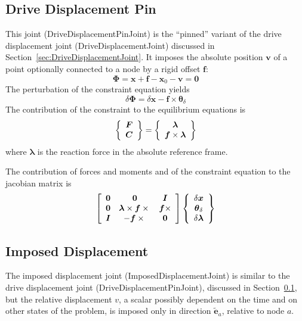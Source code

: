 \documentclass[10pt,dvips,fleqn]{report}
\newcommand{\T}[1]{\boldsymbol{#1}}
\begin{document}
\subsection{Drive Displacement Pin}
\label{sec:DriveDisplacementPinJoint}
This joint (DriveDisplacementPinJoint) is the ``pinned'' variant 
of the drive displacement joint (DriveDisplacementJoint) discussed
in Section~\ref{sec:DriveDisplacementJoint}.
It imposes the absolute position $\T{v}$ of a point
optionally connected to a node by a rigid offset $\T{f}$:
\begin{equation}
	\T{\Phi} = \T{x} + \T{f} - \T{x}_0 - \T{v} = \T{0}
\end{equation}
The perturbation of the constraint equation yields
\begin{equation}
	\delta\T{\Phi} = 
	\delta\T{x} - \T{f}\times \T{\theta}_{\delta}
\end{equation}
The contribution of the constraint to the equilibrium equations is
\begin{equation}
	\cubr{\cvvect{
		\T{F} \\
		\T{C}
	}} = \cubr{\cvvect{
		\T{\lambda} \\
		\T{f}\times \T{\lambda}
	}}
\end{equation}
where $\T{\lambda}$ is the reaction force in the absolute reference frame.

The contribution of forces and moments and of the constraint equation 
to the jacobian matrix is
\begin{equation}
	\sqbr{\matr{ccc}{
		\T{0} &
			\T{0} &
			\T{I} \\
		\T{0} &
			\T{\lambda}\times\T{f}\times{} &
			\T{f}\times \\
		\T{I} &
			- \T{f}\times{} &
			\T{0}
	}}\cubr{\cvvect{
		\delta\T{x} \\
		\T{\theta}_{\delta} \\
		\delta\T{\lambda}
	}}
\end{equation}



\subsection{Imposed Displacement}
\label{sec:ImposedDisplacementJoint}
The imposed displacement joint (ImposedDisplacementJoint) 
is similar to the drive displacement joint (DriveDisplacementPinJoint),
discussed in Section~\ref{sec:DriveDisplacementPinJoint},
but the relative displacement $v$, a scalar possibly dependent on the time
and on other states of the problem, is imposed only in direction 
$\tilde{\T{e}}_a$, relative to node $a$.
\end{document}
